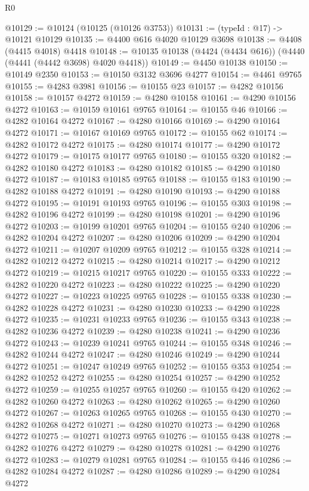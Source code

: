 \begin{lexlean}{R0}
\begin{coremodule}
@10129 := @10124 (@10125 (@10126 @3753))
@10131 := (typeId : @17) -> @10121 @10129
@10135 := @4400 @616 @4020 @10129 @3698
@10138 := @4408 (@4415 @4018) @4418
@10148 := @10135 @10138 (@4424 (@4434 @616)) (@4440 (@4441 (@4442 @3698) @4020 @4418))
@10149 := @4450 @10138
@10150 := @10149 @2350
@10153 := @10150 @3132 @3696 @4277
@10154 := @4461 @9765
@10155 := @4283 @3981
@10156 := @10155 @23
@10157 := @4282 @10156
@10158 := @10157 @4272
@10159 := @4280 @10158
@10161 := @4290 @10156 @4272
@10163 := @10159 @10161 @9765
@10164 := @10155 @46
@10166 := @4282 @10164 @4272
@10167 := @4280 @10166
@10169 := @4290 @10164 @4272
@10171 := @10167 @10169 @9765
@10172 := @10155 @62
@10174 := @4282 @10172 @4272
@10175 := @4280 @10174
@10177 := @4290 @10172 @4272
@10179 := @10175 @10177 @9765
@10180 := @10155 @320
@10182 := @4282 @10180 @4272
@10183 := @4280 @10182
@10185 := @4290 @10180 @4272
@10187 := @10183 @10185 @9765
@10188 := @10155 @183
@10190 := @4282 @10188 @4272
@10191 := @4280 @10190
@10193 := @4290 @10188 @4272
@10195 := @10191 @10193 @9765
@10196 := @10155 @303
@10198 := @4282 @10196 @4272
@10199 := @4280 @10198
@10201 := @4290 @10196 @4272
@10203 := @10199 @10201 @9765
@10204 := @10155 @240
@10206 := @4282 @10204 @4272
@10207 := @4280 @10206
@10209 := @4290 @10204 @4272
@10211 := @10207 @10209 @9765
@10212 := @10155 @328
@10214 := @4282 @10212 @4272
@10215 := @4280 @10214
@10217 := @4290 @10212 @4272
@10219 := @10215 @10217 @9765
@10220 := @10155 @333
@10222 := @4282 @10220 @4272
@10223 := @4280 @10222
@10225 := @4290 @10220 @4272
@10227 := @10223 @10225 @9765
@10228 := @10155 @338
@10230 := @4282 @10228 @4272
@10231 := @4280 @10230
@10233 := @4290 @10228 @4272
@10235 := @10231 @10233 @9765
@10236 := @10155 @343
@10238 := @4282 @10236 @4272
@10239 := @4280 @10238
@10241 := @4290 @10236 @4272
@10243 := @10239 @10241 @9765
@10244 := @10155 @348
@10246 := @4282 @10244 @4272
@10247 := @4280 @10246
@10249 := @4290 @10244 @4272
@10251 := @10247 @10249 @9765
@10252 := @10155 @353
@10254 := @4282 @10252 @4272
@10255 := @4280 @10254
@10257 := @4290 @10252 @4272
@10259 := @10255 @10257 @9765
@10260 := @10155 @420
@10262 := @4282 @10260 @4272
@10263 := @4280 @10262
@10265 := @4290 @10260 @4272
@10267 := @10263 @10265 @9765
@10268 := @10155 @430
@10270 := @4282 @10268 @4272
@10271 := @4280 @10270
@10273 := @4290 @10268 @4272
@10275 := @10271 @10273 @9765
@10276 := @10155 @438
@10278 := @4282 @10276 @4272
@10279 := @4280 @10278
@10281 := @4290 @10276 @4272
@10283 := @10279 @10281 @9765
@10284 := @10155 @446
@10286 := @4282 @10284 @4272
@10287 := @4280 @10286
@10289 := @4290 @10284 @4272

\end{coremodule}
\end{lexlean}
